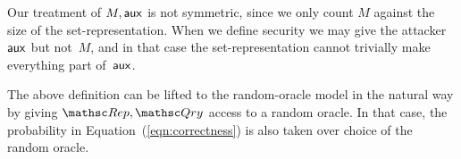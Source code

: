 
Our treatment of $M,{\sf aux}$ is not symmetric, since we only count $M$ against the size
of the set-representation. When we define security
we may give the attacker ${\sf aux}$ but not~$M$, and in that case the set-representation cannot
trivially make everything part of~${\sf aux}$. 

The above definition can be lifted to the random-oracle model in the natural way
by giving $\Rep, \Qry$ access to a random oracle. In that case,
the probability in Equation~(\ref{eqn:correctness})
is also taken over choice of the random oracle.

